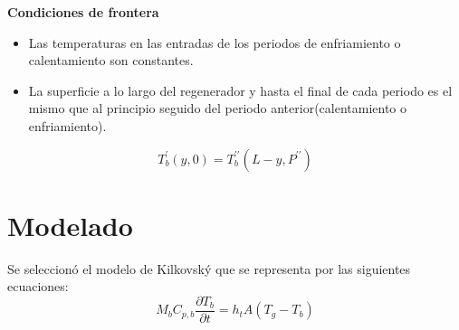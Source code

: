 \documentclass[12pt,letterpaper,final]{article}%
\begin{document}
\textbf{Condiciones de frontera}
\begin{itemize}
	\item Las temperaturas en las entradas de los periodos de enfriamiento o calentamiento son constantes.
	\item La superficie a lo largo del regenerador y hasta el final de cada periodo es el mismo que al principio seguido del periodo anterior(calentamiento o enfriamiento). 
\end{itemize}
\begin{equation*}
	T_b^\prime (y,0) = T_b^{\prime \prime} (L - y,P^{\prime \prime})
\end{equation*}

\newpage
\section{Modelado}
Se seleccionó el modelo de Kilkovský\cite{Kilkovsky2020} que se representa por las siguientes ecuaciones:
\begin{equation}
	M_b C_{p,b}\frac{\partial T_b}{\partial t} = h_t A (T_g - T_b) 
\end{equation}
\end{document}
